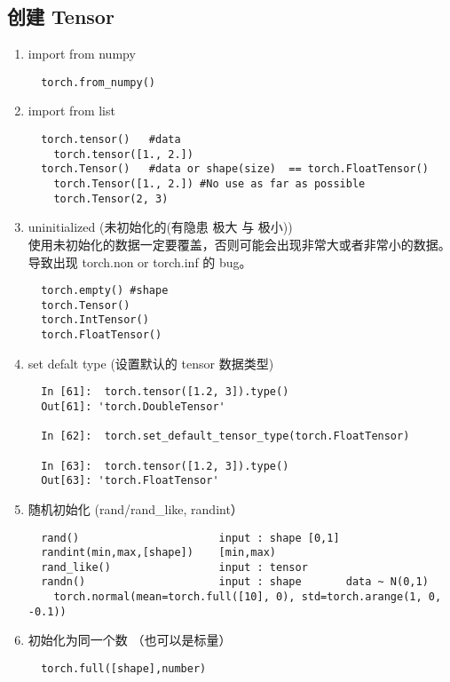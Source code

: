 \subsection{创建 Tensor}

\begin{enumerate}
  \item import from numpy
  \begin{lstlisting}
  torch.from_numpy()
  \end{lstlisting}

  \item import from list
  \begin{lstlisting}
  torch.tensor()   #data
    torch.tensor([1., 2.])
  torch.Tensor()   #data or shape(size)  == torch.FloatTensor()
    torch.Tensor([1., 2.]) #No use as far as possible
    torch.Tensor(2, 3)
  \end{lstlisting}

  \item uninitialized (未初始化的(有隐患 极大 与 极小)) \\
  使用未初始化的数据一定要覆盖，否则可能会出现非常大或者非常小的数据。\\
  导致出现 torch.non or torch.inf 的 bug。
  \begin{lstlisting}
  torch.empty() #shape
  torch.Tensor()
  torch.IntTensor()
  torch.FloatTensor()
  \end{lstlisting}

  \item set defalt type (设置默认的 tensor 数据类型)
  \begin{lstlisting}
  In [61]:  torch.tensor([1.2, 3]).type()
  Out[61]: 'torch.DoubleTensor'

  In [62]:  torch.set_default_tensor_type(torch.FloatTensor)

  In [63]:  torch.tensor([1.2, 3]).type()
  Out[63]: 'torch.FloatTensor'
  \end{lstlisting}

  \item 随机初始化 (rand/rand\_like, randint）
  \begin{lstlisting}
  rand()                      input : shape [0,1]
  randint(min,max,[shape])    [min,max)
  rand_like()                 input : tensor
  randn()                     input : shape       data ~ N(0,1)
    torch.normal(mean=torch.full([10], 0), std=torch.arange(1, 0, -0.1))
  \end{lstlisting}

  \item 初始化为同一个数 （也可以是标量）
  \begin{lstlisting}
  torch.full([shape],number)
  \end{lstlisting}


\end{enumerate}
